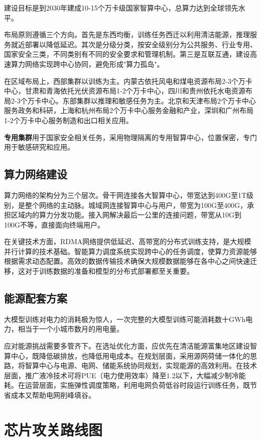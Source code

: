 建设目标是到2030年建成10-15个万卡级国家智算中心，总算力达到全球领先水平。

布局原则遵循三个方向。首先是东西均衡，训练任务西迁以利用清洁能源，推理服务就近部署以降低延迟。其次是分级分类，按安全级别分为公共服务、行业专用、国家安全三类，不同类别有不同的安全要求和管理机制。第三是互联互通，建设高速算力网络实现跨中心协同，避免形成"算力孤岛"。

在区域布局上，西部集群以训练为主。内蒙古依托风电和煤电资源布局2-3个万卡中心，甘肃和青海依托光伏资源布局1-2个万卡中心，四川和贵州依托水电资源布局2-3个万卡中心。东部集群以推理和敏感任务为主。北京和天津布局2个万卡中心服务政务和科研，上海和杭州布局2个万卡中心服务金融和产业，深圳和广州布局1-2个万卡中心服务制造和出口相关应用。

\textbf{专用集群}用于国家安全相关任务，采用物理隔离的专用智算中心，位置保密，专门用于敏感研究和应用。

\subsection{算力网络建设}

算力网络的架构分为三个层次。骨干网连接各大智算中心，带宽达到400G至1T级别，是整个网络的主动脉。城域网连接智算中心与用户，带宽为100G至400G，承担区域内的算力分发功能。接入网解决最后一公里的连接问题，带宽从10G到100G不等，直接面向终端用户。

在关键技术方面，RDMA网络提供低延迟、高带宽的分布式训练支持，是大规模并行计算的技术基础。智能算力调度系统实现跨中心的任务调度，使算力资源能够根据需求动态配置。高效的数据传输技术确保大规模数据能够在各中心之间快速迁移，这对于训练数据的准备和模型的分布式部署都至关重要。

\subsection{能源配套方案}

大模型训练对电力的消耗极为惊人，一次完整的大模型训练可能消耗数十GWh电力，相当于一个小城市数月的用电量。

应对能源挑战需要多管齐下。在选址优化方面，应优先在清洁能源富集地区建设智算中心，既降低碳排放，也降低用电成本。在规划层面，采用源网荷储一体化的思路，将智算中心与电源、电网、储能系统协同规划，实现能源的高效利用。在技术层面，推广液冷技术可将PUE（电力使用效率）降至1.2以下，大幅减少制冷能耗。在运营层面，实施弹性调度策略，利用电网负荷低谷时段运行训练任务，既节省成本又帮助电网削峰填谷。

\section{芯片攻关路线图}

